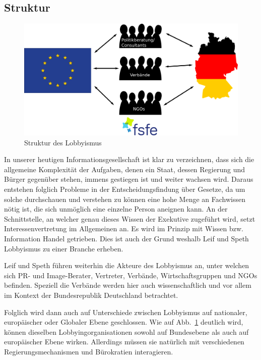 \subsection{Struktur}
\begin{figure}[h]
	\includegraphics[width=\textwidth]{struktur}
	\centering
	\caption{Struktur des Lobbyismus}
	\label{fig:structure_image}
\end{figure}
In unserer heutigen Informationsgesellschaft ist klar zu verzeichnen, dass sich
die allgemeine Komplexität der Aufgaben, denen ein Staat, dessen Regierung und 
Bürger gegenüber stehen, immens gestiegen ist und weiter wachsen wird.
Daraus entstehen folglich Probleme in der Entscheidungsfindung über Gesetze, da 
um solche durchschauen und verstehen zu können eine hohe Menge an Fachwissen 
nötig ist, die sich unmöglich eine einzelne Person aneignen kann. An der 
Schnittstelle, an welcher genau dieses Wissen der Exekutive zugeführt wird, 
setzt Interessenvertretung im Allgemeinen an. Es wird im Prinzip mit Wissen 
bzw. Information Handel getrieben. Dies ist auch der Grund weshalb Leif und 
Speth\cite{LeifSpeth200312} Lobbyismus zu einer Branche erheben.

Leif und Speth führen weiterhin die Akteure des Lobbyismus an, unter 
welchen sich PR- und Image-Berater, Vertreter, Verbände, Wirtschaftsgruppen und 
NGOs befinden. Speziell die Verbände werden hier auch wissenschaftlich 
und vor allem im Kontext der Bundesrepublik Deutschland betrachtet.

Folglich wird dann auch auf Unterschiede zwischen Lobbyismus auf nationaler, 
europäischer oder Globaler Ebene geschlossen. Wie auf 
Abb.~\ref{fig:structure_image} 
deutlich wird, können \zB dieselben Lobbyingorganisationen sowohl auf 
Bundesebene als auch auf europäischer Ebene wirken. Allerdings müssen sie 
natürlich mit verschiedenen Regierungsmechanismen und Bürokratien interagieren.

